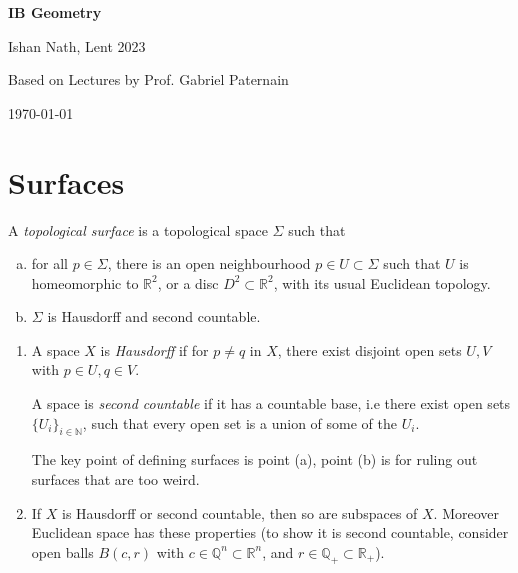 \documentclass[12pt]{article}
\begin{document}
\hypersetup{pageanchor=false}
\begin{titlepage}
	\begin{center}
		\vspace*{1em}
		\Huge
		\textbf{IB Geometry}

		\vspace{1em}
		\large
		Ishan Nath, Lent 2023

		\vspace{1.5em}

		\Large

		Based on Lectures by Prof. Gabriel Paternain

		\vspace{1em}

		\large
		\today
	\end{center}
	
\end{titlepage}
\hypersetup{pageanchor=true}

\tableofcontents

\newpage

\section{Surfaces}
\label{sec:surfaces}

\begin{definition}
	A \emph{topological surface} is a topological space $\Sigma$ such that
	\begin{enumerate}[(a)]
		\item for all $p \in \Sigma$, there is an open neighbourhood $p \in U \subset \Sigma$ such that $U$ is homeomorphic to $\mathbb{R}^2$, or a disc $D^2 \subset \mathbb{R}^2$, with its usual Euclidean topology.
		\item $\Sigma$ is Hausdorff and second countable.
	\end{enumerate}
\end{definition}

\begin{remark}
	\begin{enumerate}
		$\mathbb{R}^2 \simeq D(0,1) = \{x \in \mathbb{R}^2 \mid \|x\| \leq 1\}$.
		\item A space $X$ is \emph{Hausdorff} if for $p \neq q$ in $X$, there exist disjoint open sets $U, V$ with $p \in U, q \in V$.

			A space is \emph{second countable} if it has a countable base, i.e there exist open sets $\{U_i\}_{i \in \mathbb{N}}$, such that every open set is a union of some of the $U_i$.

			The key point of defining surfaces is point (a), point (b) is for ruling out surfaces that are too weird.
		\item If $X$ is Hausdorff or second countable, then so are subspaces of $X$. Moreover Euclidean space has these properties (to show it is second countable, consider open balls $B(c, r)$ with $c \in \mathbb{Q}^{n} \subset \mathbb{R}^{n}$, and $r \in \mathbb{Q}_{+} \subset \mathbb{R}_{+}$).
	\end{enumerate}
\end{remark}
\end{document}
